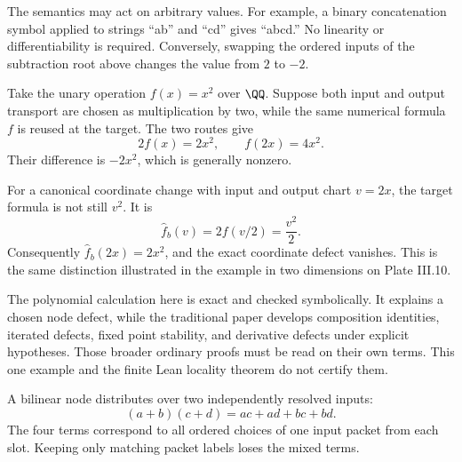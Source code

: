 The semantics may act on arbitrary values. For example, a binary concatenation symbol applied to strings ``ab'' and ``cd'' gives ``abcd.'' No linearity or differentiability is required. Conversely, swapping the ordered inputs of the subtraction root above changes the value from $2$ to $-2$.


Take the unary operation $f(x)=x^2$ over $\QQ$. Suppose both input and output transport are chosen as multiplication by two, while the same numerical formula $f$ is reused at the target. The two routes give
\[
2f(x)=2x^2,\qquad f(2x)=4x^2.
\]
Their difference is $-2x^2$, which is generally nonzero.


For a canonical coordinate change with input and output chart $v=2x$, the target formula is not still $v^2$. It is
\[
\widehat f_b(v)=2f(v/2)=\frac{v^2}{2}.
\]
Consequently $\widehat f_b(2x)=2x^2$, and the exact coordinate defect vanishes. This is the same distinction illustrated in the example in two dimensions on Plate III.10.

The polynomial calculation here is exact and checked symbolically. It explains a chosen node defect, while the traditional paper develops composition identities, iterated defects, fixed point stability, and derivative defects under explicit hypotheses. Those broader ordinary proofs must be read on their own terms. This one example and the finite Lean locality theorem do not certify them.


A bilinear node distributes over two independently resolved inputs:
\[
(a+b)(c+d)=ac+ad+bc+bd.
\]
The four terms correspond to all ordered choices of one input packet from each slot. Keeping only matching packet labels loses the mixed terms.

